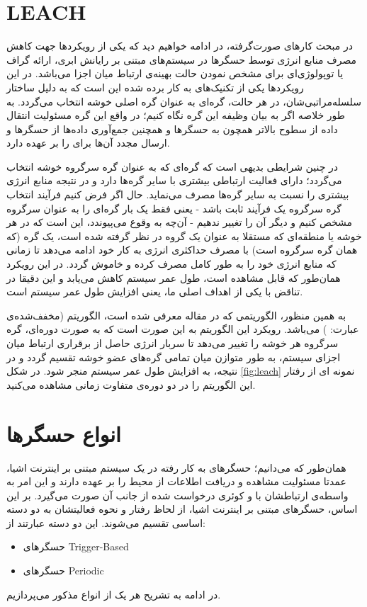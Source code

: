 \section{LEACH}
در مبحث کارهای صورت‌گرفته، در ادامه خواهیم دید که یکی از رویکردها جهت کاهش مصرف منابع انرژی توسط حسگرها در سیستم‌های مبتنی بر رایانش ابری، ارائه گراف یا توپولوژی‌ای برای مشخص نمودن حالت بهینه‌ی ارتباط میان اجزا می‌باشد. در این رویکردها یکی از تکنیک‌های به کار برده شده این است که به دلیل ساختار سلسله‌مراتبی‌شان، در هر حالت، گره‌ای به عنوان گره اصلی خوشه انتخاب می‌گردد. به طور خلاصه اگر به بیان وظیفه این گره نگاه کنیم؛ در واقع این گره مسئولیت انتقال داده از سطوح بالاتر همچون  به حسگرها و همچنین جمع‌آوری داده‌ها از حسگرها و ارسال مجدد آن‌ها برای  را بر عهده دارد.
\par
در چنین شرایطی بدیهی است که گره‌ای که به عنوان گره سرگروه خوشه انتخاب می‌گردد؛ دارای فعالیت ارتباطی بیشتری با سایر گره‌ها دارد و در نتیجه منابع انرژی بیشتری را نسبت به سایر گره‌ها مصرف می‌نماید. حال اگر فرض کنیم فرآیند انتخاب گره سرگروه یک فرآیند ثابت باشد - یعنی فقط یک بار گره‌ای را به عنوان سرگروه مشخص کنیم و دیگر آن را تغییر ندهیم - آن‌چه به وقوع می‌پیوندد، این است که در هر خوشه یا منطقه‌ای که مستقلا به عنوان یک گروه در نظر گرفته شده است، یک گره (که همان گره سرگروه است) با مصرف حداکثری انرژی به کار خود ادامه ‌می‌دهد تا زمانی که منابع انرژی خود را به طور کامل مصرف کرده و خاموش گردد. در این رویکرد همان‌طور که قابل مشاهده است، طول عمر سیستم کاهش می‌یابد و این دقیقا در تناقض با یکی از اهداف اصلی ما، یعنی افزایش طول عمر سیستم است.
\par
به همین منظور، الگوریتمی که در مقاله \cite{} معرفی شده است، الگوریتم  (مخفف‌شده‌ی عبارت: ) می‌باشد. رویکرد این الگوریتم به این صورت است که به صورت دوره‌ای، گره سرگروه هر خوشه را تغییر می‌دهد تا سربار انرژی حاصل از برقراری ارتباط میان اجزای سیستم، به طور متوازن میان تمامی گره‌های عضو خوشه تقسیم گردد و در نتیجه، به افزایش طول عمر سیستم منجر شود. در شکل \ref{fig:leach} نمونه ای از رفتار این الگوریتم را در دو دوره‌ی متفاوت زمانی مشاهده می‌کنید.

\section{انواع حسگرها}
همان‌طور که می‌دانیم؛ حسگرهای به کار رفته در یک سیستم مبتنی بر اینترنت اشیا، عمدتا مسئولیت مشاهده و دریافت اطلاعات از محیط را بر عهده دارند و این امر به واسطه‌ی ارتباطشان با  و کوئری درخواست شده از جانب آن صورت می‌گیرد. بر این اساس، حسگرهای مبتنی بر اینترنت اشیا، از لحاظ رفتار و نحوه فعالیتشان به دو دسته اساسی تقسیم می‌شوند. این دو دسته عبارتند از:
\begin{itemize}
	\item{حسگرهای Trigger-Based}
	\item{حسگرهای Periodic}
\end{itemize}
\par
در ادامه به تشریح هر یک از انواع مذکور می‌پردازیم.

